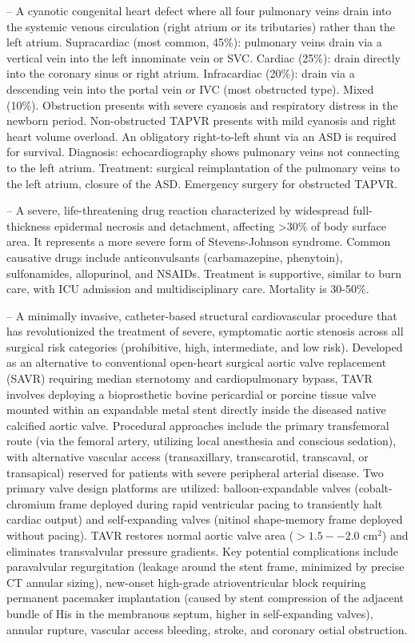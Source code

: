 -- A cyanotic congenital heart defect where all four pulmonary veins drain into the systemic venous circulation (right atrium or its tributaries) rather than the left atrium. Supracardiac (most common, 45\%): pulmonary veins drain via a vertical vein into the left innominate vein or SVC. Cardiac (25\%): drain directly into the coronary sinus or right atrium. Infracardiac (20\%): drain via a descending vein into the portal vein or IVC (most obstructed type). Mixed (10\%). Obstruction presents with severe cyanosis and respiratory distress in the newborn period. Non-obstructed TAPVR presents with mild cyanosis and right heart volume overload. An obligatory right-to-left shunt via an ASD is required for survival. Diagnosis: echocardiography shows pulmonary veins not connecting to the left atrium. Treatment: surgical reimplantation of the pulmonary veins to the left atrium, closure of the ASD. Emergency surgery for obstructed TAPVR.

-- A severe, life-threatening drug reaction characterized by widespread full-thickness epidermal necrosis and detachment, affecting >30\% of body surface area. It represents a more severe form of Stevens-Johnson syndrome. Common causative drugs include anticonvulsants (carbamazepine, phenytoin), sulfonamides, allopurinol, and NSAIDs. Treatment is supportive, similar to burn care, with ICU admission and multidisciplinary care. Mortality is 30-50\%.

-- A minimally invasive, catheter-based structural cardiovascular procedure that has revolutionized the treatment of severe, symptomatic aortic stenosis across all surgical risk categories (prohibitive, high, intermediate, and low risk). Developed as an alternative to conventional open-heart surgical aortic valve replacement (SAVR) requiring median sternotomy and cardiopulmonary bypass, TAVR involves deploying a bioprosthetic bovine pericardial or porcine tissue valve mounted within an expandable metal stent directly inside the diseased native calcified aortic valve. Procedural approaches include the primary transfemoral route (via the femoral artery, utilizing local anesthesia and conscious sedation), with alternative vascular access (transaxillary, transcarotid, transcaval, or transapical) reserved for patients with severe peripheral arterial disease. Two primary valve design platforms are utilized: balloon-expandable valves (cobalt-chromium frame deployed during rapid ventricular pacing to transiently halt cardiac output) and self-expanding valves (nitinol shape-memory frame deployed without pacing). TAVR restores normal aortic valve area ($>1.5--2.0$ cm$^2$) and eliminates transvalvular pressure gradients. Key potential complications include paravalvular regurgitation (leakage around the stent frame, minimized by precise CT annular sizing), new-onset high-grade atrioventricular block requiring permanent pacemaker implantation (caused by stent compression of the adjacent bundle of His in the membranous septum, higher in self-expanding valves), annular rupture, vascular access bleeding, stroke, and coronary ostial obstruction.

